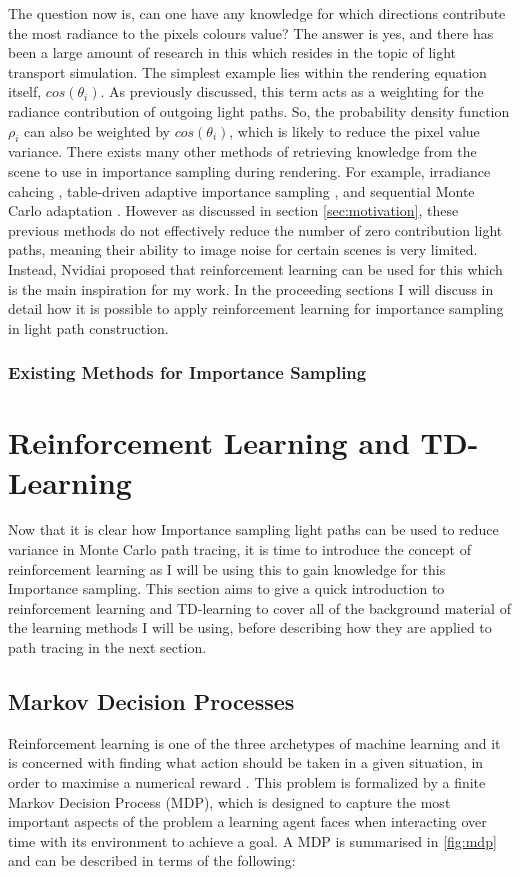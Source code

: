 \documentclass[../dissertation.tex]{subfiles}
\begin{document}
The question now is, can one have any knowledge for which directions contribute the most radiance to the pixels colours value? The answer is yes, and there has been a large amount of research in this which resides in the topic of light transport simulation. The simplest example lies within the rendering equation itself, $cos(\theta_i)$. As previously discussed, this term acts as a weighting for the radiance contribution of outgoing light paths. So, the probability density function $\rho_i$ can also be weighted by $cos(\theta_i)$, which is likely to reduce the pixel value variance. There exists many other methods of retrieving knowledge from the scene to use in importance sampling during rendering. For example, irradiance cahcing \cite{bashford2012significance}, table-driven adaptive importance sampling \cite{cline2008table}, and sequential Monte Carlo adaptation \cite{pegoraro2008towards}. However as discussed in section \ref{sec:motivation}, these previous methods do not effectively reduce the number of zero contribution light paths, meaning their ability to image noise for certain scenes is very limited. Instead, Nvidiai proposed that reinforcement learning can be used for this \cite{dahm2017learning} which is the main inspiration for my work. In the proceeding sections I will discuss in detail how it is possible to apply reinforcement learning for importance sampling in light path construction.

\subsubsection{Existing Methods for Importance Sampling}

\section{Reinforcement Learning and TD-Learning}
Now that it is clear how Importance sampling light paths can be used to reduce variance in Monte Carlo path tracing, it is time to introduce the concept of reinforcement learning as I will be using this to gain knowledge for this Importance sampling. This section aims to give a quick introduction to reinforcement learning and TD-learning to cover all of the background material of the learning methods I will be using, before describing how they are applied to path tracing in the next section.

\subsection{Markov Decision Processes}
Reinforcement learning is one of the three archetypes of machine learning and it is concerned with finding what action should be taken in a given situation, in order to maximise a numerical reward \cite{sutton2011reinforcement}. This problem is formalized by a finite Markov Decision Process (MDP), which is designed to capture the most important aspects of the problem a learning agent faces when interacting over time with its environment to achieve a goal. A MDP is summarised in \ref{fig:mdp} and can be described in terms of the following:
\end{document}
